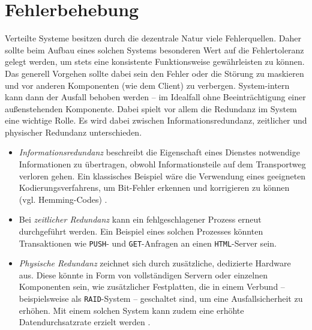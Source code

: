 \documentclass[12pt,a4paper,parskip=half]{scrreprt}
\begin{document}
		\section{Fehlerbehebung}
			
			Verteilte Systeme besitzen durch die dezentrale Natur viele Fehlerquellen. Daher sollte beim Aufbau eines solchen Systems besonderen Wert auf die Fehlertoleranz gelegt werden, um stets eine konsistente Funktionsweise gewährleisten zu können. \\
			Das generell Vorgehen sollte dabei sein den Fehler oder die Störung zu maskieren und vor anderen Komponenten (wie dem Client) zu verbergen. System-intern kann dann der Ausfall behoben werden -- im Idealfall ohne Beeinträchtigung einer außenstehenden Komponente. Dabei spielt vor allem die Redundanz im System eine wichtige Rolle. Es wird dabei zwischen Informationsredundanz, zeitlicher und physischer Redundanz unterschieden.
			
			\begin{itemize}
				\item \textit{Informationsredundanz} beschreibt die Eigenschaft eines Dienstes notwendige Informationen zu übertragen, obwohl Informationsteile auf dem Transportweg verloren gehen. Ein klassisches Beispiel wäre die Verwendung eines geeigneten Kodierungsverfahrens, um Bit-Fehler erkennen und korrigieren zu können (vgl. Hemming-Codes) \cite{hamming}.
				\item Bei \textit{zeitlicher Redundanz} kann ein fehlgeschlagener Prozess erneut durchgeführt werden. Ein Beispiel eines solchen Prozesses könnten Transaktionen wie \texttt{PUSH}- und \texttt{GET}-Anfragen an einen \texttt{HTML}-Server sein.
				\item \textit{Physische Redundanz} zeichnet sich durch zusätzliche, dedizierte Hardware aus. Diese könnte in Form von vollständigen Servern oder einzelnen Komponenten sein, wie zusätzlicher Festplatten, die in einem Verbund -- beispielsweise als \texttt{RAID}-System -- geschaltet sind, um eine Ausfallsicherheit zu erhöhen. Mit einem solchen System kann zudem eine erhöhte Datendurchsatzrate erzielt werden \cite{raid}.
			\end{itemize}
			
	\newpage
	
	\nocite{*}
	\thispagestyle{headings}
	
	
	 
\end{document}

